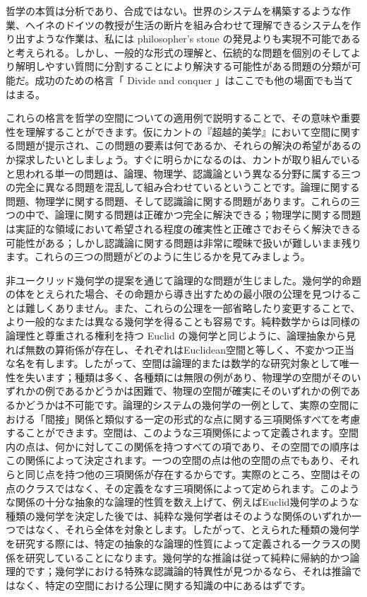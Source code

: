 \documentclass[a4paper,11pt,openany]{ltjsbook}
\begin{document}
哲学の本質は分析であり、合成ではない。世界のシステムを構築するような作業、ヘイネのドイツの教授が生活の断片を組み合わせて理解できるシステムを作り出すような作業は、私には philosopher's stone の発見よりも実現不可能であると考えられる。しかし、一般的な形式の理解と、伝統的な問題を個別のそしてより解明しやすい質問に分割することにより解決する可能性がある問題の分類が可能だ。成功のための格言「 Divide and conquer 」はここでも他の場面でも当てはまる。

これらの格言を哲学の空間についての適用例で説明することで、その意味や重要性を理解することができます。仮にカントの『超越的美学』において空間に関する問題が提示され、この問題の要素は何であるか、それらの解決の希望があるのか探求したいとしましょう。すぐに明らかになるのは、カントが取り組んでいると思われる単一の問題は、論理、物理学、認識論という異なる分野に属する三つの完全に異なる問題を混乱して組み合わせているということです。論理に関する問題、物理学に関する問題、そして認識論に関する問題があります。これらの三つの中で、論理に関する問題は正確かつ完全に解決できる；物理学に関する問題は実証的な領域において希望される程度の確実性と正確さでおそらく解決できる可能性がある；しかし認識論に関する問題は非常に曖昧で扱いが難しいまま残ります。これらの三つの問題がどのように生じるかを見てみましょう。


非ユークリッド幾何学の提案を通じて論理的な問題が生じました。幾何学的命題の体をとえられた場合、その命題から導き出すための最小限の公理を見つけることは難しくありません。また、これらの公理を一部省略したり変更することで、より一般的なまたは異なる幾何学を得ることも容易です。純粋数学からは同様の論理性と尊重される権利を持つ Euclid の幾何学と同じように、論理抽象から見れば無数の算術係が存在し、それぞれはEuclidean空間と等しく、不変かつ正当な名を有します。したがって、空間は論理的または数学的な研究対象として唯一性を失います；種類は多く、各種類には無限の例があり、物理学の空間がそのいずれかの例であるかどうかは困難で、物理の空間が確実にそのいずれかの例であるかどうかは不可能です。論理的システムの幾何学の一例として、実際の空間における「間接」関係と類似する一定の形式的な点に関する三項関係すべてを考慮することができます。空間は、このような三項関係によって定義されます。空間内の点は、何かに対してこの関係を持つすべての項であり、その空間での順序はこの関係によって決定されます。一つの空間の点は他の空間の点でもあり、それらと同じ点を持つ他の三項関係が存在するからです。実際のところ、空間はその点のクラスではなく、その定義をなす三項関係によって定められます。このような関係の十分な抽象的な論理的性質を数え上げて、例えばEuclid幾何学のような種類の幾何学を決定した後では、純粋な幾何学者はそのような関係のいずれか一つではなく、それら全体を対象とします。したがって、とえられた種類の幾何学を研究する際には、特定の抽象的な論理的性質によって定義される一クラスの関係を研究していることになります。幾何学的な推論は従って純粋に帰納的かつ論理的です；幾何学における特殊な認識論的特異性が見つかるなら、それは推論ではなく、特定の空間における公理に関する知識の中にあるはずです。
\end{document}
